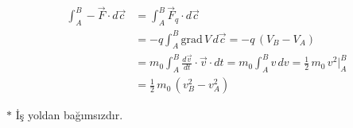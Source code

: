 \documentclass[11pt,a4paper]{article}
\begin{document}
\begin{align*}
\int_A^B-\vec F\cdot d\vec c&=\int_A^B\vec F_q\cdot d\vec c\\
&=-q\int_A^B\mathrm{grad}\,V\,d\vec c=-q\,(V_B-V_A)\\
&=m_0\int_A^B\frac{d\vec v}{dt}\cdot\vec v\cdot dt=m_0\int_A^B v\,dv=\frac12\,m_0\,v^2\Big|_A^B\\
&=\frac12\,m_0\,(v_B^2-v_A^2)
\end{align*}


\textcolor{kirmizikalem}{$*$ İş yoldan bağımsızdır.}
\end{document}
